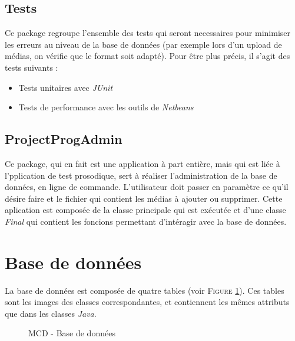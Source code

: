 \subsection{Tests}

Ce package regroupe l'ensemble des tests qui seront necessaires pour minimiser les erreurs au niveau de la base de données (par exemple lors d'un upload de médias, on vérifie que le format soit adapté). Pour être plus précis, il s'agit des tests suivants :
\begin{itemize}
 \item Tests unitaires avec \textit{JUnit}
 \item Tests de performance avec les outils de \textit{Netbeans}
\end{itemize}


\subsection{ProjectProgAdmin}

Ce package, qui en fait est une application à part entière, mais qui est liée à l'pplication de test prosodique, sert à réaliser l'administration de la base de données, en ligne de commande. L'utilisateur doit passer en paramètre ce qu'il désire faire et le fichier qui contient les médias à ajouter ou supprimer.
Cette aplication est composée de la classe principale qui est exécutée et d'une classe \textit{Final} qui contient les foncions permettant d'intéragir avec la base de données.

\section{Base de données}

La base de données est composée de quatre tables (voir \textsc{Figure} \ref{MCD}). Ces tables sont les images des classes correspondantes, et contiennent les mêmes attributs que dans les classes \textit{Java}.

\begin{figure}[!h]
\begin{center}
  \caption{MCD - Base de données}
  \label{MCD} 
\end{center}
\end{figure}